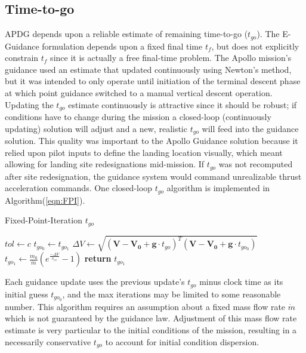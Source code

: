 \subsection{Time-to-go} \label{sec:Time-to-go}
APDG depends upon a reliable estimate of remaining time-to-go ($t_{go}$). The E-Guidance formulation depends upon a fixed final time $t_f$, but does not explicitly constrain $t_f$ since it is actually a free final-time problem. The Apollo mission's guidance used an estimate that updated continuously using Newton's method, but it was intended to only operate until initiation of the terminal descent phase at which point guidance switched to a manual vertical descent operation. Updating the $t_{go}$ estimate continuously is attractive since it should be robust; if conditions have to change during the mission a closed-loop (continuously updating) solution will adjust and a new, realistic $t_{go}$ will feed into the guidance solution. This quality was important to the Apollo Guidance solution because it relied upon pilot inputs to define the landing location visually, which meant allowing for landing site redesignations mid-mission. If $t_{go}$ was not recomputed after site redesignation, the guidance system would command unrealizable thrust acceleration commands. One closed-loop $t_{go}$ algorithm is implemented in Algorithm\:(\ref{eqn:FPI}).

\begin{algorithm}[ht]
	\caption{Fixed-Point-Iteration $t_{go}$}\label{eqn:FPI}
	\begin{algorithmic}[1]
		\State $tol\gets c$
		\State $t_{go_0} \gets t_{go_1}$
		\State $\Delta V \gets \sqrt{(\bm{V}-\bm{V_0} + \bm{g}\cdot t_{go})^T(\bm{V}-\bm{V_0} + \bm{g}\cdot t_{go_0})}$
		\State $t_{go_1} \gets \frac{m_0}{\dot{m}}\left(e^{\frac{-\Delta V}{v_{ex}}}-1\right)$ 
		\EndWhile
		\State \textbf{return} $t_{go_1}$
	\end{algorithmic}
\end{algorithm}

Each guidance update uses the previous update's $t_{go}$ minus clock time as its initial guess $t_{go_0}$, and the max iterations may be limited to some reasonable number. This algorithm requires an assumption about a fixed mass flow rate $\dot{m}$ which is not guaranteed by the guidance law. Adjustment of this mass flow rate estimate is very particular to the initial conditions of the mission, resulting in a necessarily conservative $t_{go}$ to account for initial condition dispersion.

